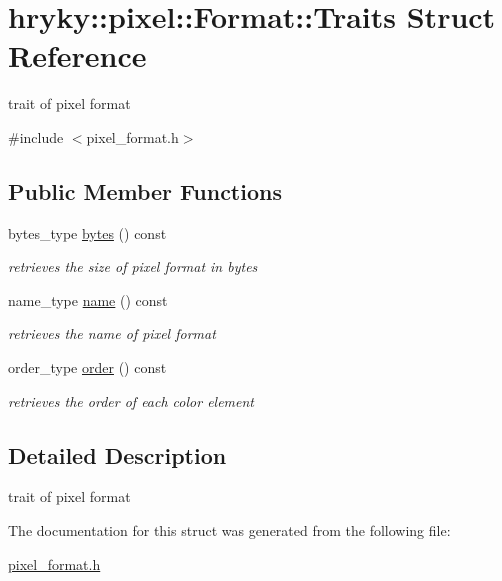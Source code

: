 \hypertarget{structhryky_1_1pixel_1_1_format_1_1_traits}{\section{hryky\-:\-:pixel\-:\-:Format\-:\-:Traits Struct Reference}
\label{structhryky_1_1pixel_1_1_format_1_1_traits}
}


trait of pixel format  




{\ttfamily \#include $<$pixel\-\_\-format.\-h$>$}

\subsection*{Public Member Functions}
\begin{DoxyCompactItemize}
\item 
\hypertarget{structhryky_1_1pixel_1_1_format_1_1_traits_a3aa3bca384e61fb00c2c043609dd7786}{bytes\-\_\-type \hyperlink{structhryky_1_1pixel_1_1_format_1_1_traits_a3aa3bca384e61fb00c2c043609dd7786}{bytes} () const }\label{structhryky_1_1pixel_1_1_format_1_1_traits_a3aa3bca384e61fb00c2c043609dd7786}

\begin{DoxyCompactList}\small\item\em retrieves the size of pixel format in bytes \end{DoxyCompactList}\item 
\hypertarget{structhryky_1_1pixel_1_1_format_1_1_traits_a97fd4ec219a34e3bf68564fa09282eb8}{name\-\_\-type \hyperlink{structhryky_1_1pixel_1_1_format_1_1_traits_a97fd4ec219a34e3bf68564fa09282eb8}{name} () const }\label{structhryky_1_1pixel_1_1_format_1_1_traits_a97fd4ec219a34e3bf68564fa09282eb8}

\begin{DoxyCompactList}\small\item\em retrieves the name of pixel format \end{DoxyCompactList}\item 
\hypertarget{structhryky_1_1pixel_1_1_format_1_1_traits_a2adccc1b9f085b88aa595dad194f66da}{order\-\_\-type \hyperlink{structhryky_1_1pixel_1_1_format_1_1_traits_a2adccc1b9f085b88aa595dad194f66da}{order} () const }\label{structhryky_1_1pixel_1_1_format_1_1_traits_a2adccc1b9f085b88aa595dad194f66da}

\begin{DoxyCompactList}\small\item\em retrieves the order of each color element \end{DoxyCompactList}\end{DoxyCompactItemize}


\subsection{Detailed Description}
trait of pixel format 

The documentation for this struct was generated from the following file\-:\begin{DoxyCompactItemize}
\item 
\hyperlink{pixel__format_8h}{pixel\-\_\-format.\-h}\end{DoxyCompactItemize}
